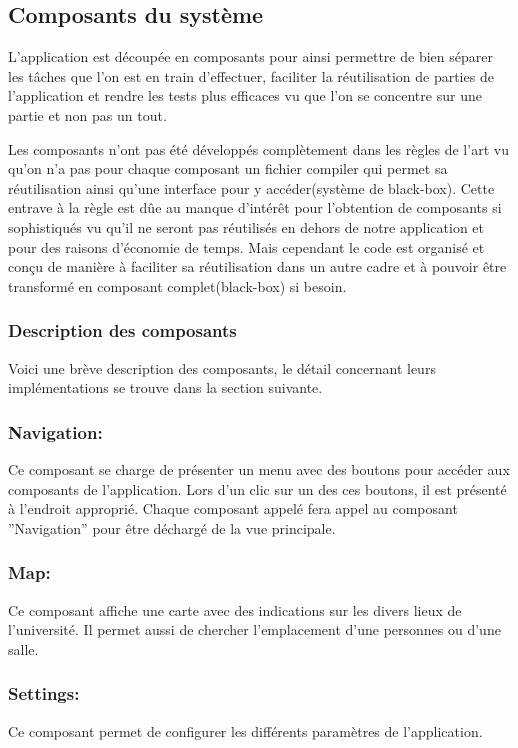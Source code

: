 			 
	\subsection{Composants du système}
		L'application est découpée en composants pour ainsi permettre de bien séparer les tâches que l'on est en train d'effectuer, faciliter la réutilisation de parties de l'application et rendre les tests plus efficaces vu que l'on se concentre sur une partie et non pas un tout.

		Les composants n'ont pas été développés complètement dans les règles de l'art vu qu'on n'a pas pour chaque composant un fichier compiler qui permet sa réutilisation ainsi qu'une interface pour y accéder(système de black-box). Cette entrave à la règle est dûe au manque d'intérêt pour l'obtention de composants si sophistiqués vu qu'il ne seront pas réutilisés en dehors de notre application et pour des raisons d'économie de temps. Mais cependant le code est organisé et conçu de manière à faciliter sa réutilisation dans un autre cadre et à pouvoir être transformé en composant complet(black-box) si besoin.
		
		\subsubsection{Description des composants}
		Voici une brève description des composants, le détail concernant leurs implémentations se trouve dans la section suivante.
		\subsubsection*{Navigation:}
		Ce composant se charge de présenter un menu avec des boutons pour accéder aux composants de l'application. Lors d'un clic sur un des ces boutons, il est présenté à l'endroit approprié. Chaque composant appelé fera appel au composant ''Navigation'' pour être déchargé de la vue principale.
		\subsubsection*{Map:}
		Ce composant affiche une carte avec des indications sur les divers lieux de l'université. Il permet aussi de chercher l'emplacement d'une personnes ou d'une salle.
		\subsubsection*{Settings:}
		Ce composant permet de configurer les différents paramètres de l'application.
